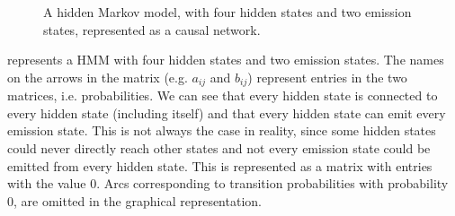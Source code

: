 \begin{figure}[htbp]
\caption[A HMM represented as a causal network.]{A hidden Markov model, with four hidden states and two emission states, represented as a causal network.}\label{fig:HMMCausalNet}
\end{figure}

 represents a HMM with four hidden states and two emission states. The names on the arrows in the matrix (e.g. $a_{ij}$ and $b_{ij}$) represent entries in the two matrices, i.e. probabilities. We can see that every hidden state is connected to every hidden state (including itself) and that every hidden state can emit every emission state. This is not always the case in reality, since some hidden states could never directly reach other states and not every emission state could be emitted from every hidden state. This is represented as a matrix with entries with the value 0. Arcs corresponding to transition probabilities with probability 0, are omitted in the graphical representation.

